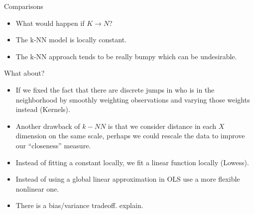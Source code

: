 \documentclass[11pt,handout,xcolor=pdftex,dvipsnames,table,mathserif,aspectratio=169]{beamer}
\begin{document}
\begin{frame}{Comparisons}
\begin{itemize}
\item What would happen if $K \rightarrow N$?
\item The k-NN model is locally constant.
\item The k-NN approach tends to be really bumpy which can be undesirable.
\end{itemize}
\end{frame}
\begin{frame}{What about?}
\begin{itemize}
\item If we fixed the fact that there are discrete jumps in who is in the neighborhood by smoothly weighting observations and varying those weights instead (Kernels).
\item Another drawback of $k-NN$ is that we consider distance in each $X$ dimension on the same scale, perhaps we could rescale the data to improve our ``closeness'' measure.
\item Instead of fitting a constant locally, we fit a linear function locally (Lowess).
\item Instead of using a global linear approximation in OLS use a more flexible nonlinear one.
\item There is a bias/variance tradeoff. \alert{explain}.
\end{itemize}
\end{frame}
\end{document}
